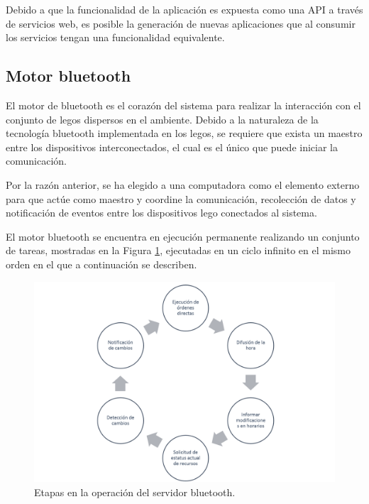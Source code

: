 \documentclass[12pt]{article}
\begin{document}
Debido a que la funcionalidad de la aplicación es expuesta como una API a través de servicios web, es posible la generación de nuevas aplicaciones que al consumir los servicios tengan una funcionalidad equivalente.

\subsection{Motor bluetooth} %
\label{sub:motor_bluetooth}
El motor de bluetooth es el corazón del sistema para realizar la interacción con el conjunto de legos dispersos en el ambiente.
Debido a la naturaleza de la tecnología bluetooth implementada en los legos, se requiere que exista un maestro entre los dispositivos interconectados, el cual es el único que puede iniciar la comunicación.


Por la razón anterior, se ha elegido a una computadora como el elemento externo para que actúe como maestro y coordine la comunicación, recolección de datos y notificación de eventos entre los dispositivos lego conectados al sistema.

El motor bluetooth se encuentra en ejecución permanente realizando un conjunto de tareas, mostradas en la Figura \ref{fig:etapas-operacion-servidor}, ejecutadas en un ciclo infinito en el mismo orden en el que a continuación se describen.

\begin{figure}
\centering
\includegraphics[width=\textwidth]{imagenes/etapas-operacion-servidor}
\caption[Etapas en la operación del servidor bluetooth]{Etapas en la operación del servidor bluetooth.}
\label{fig:etapas-operacion-servidor}
\end{figure}
\end{document}
